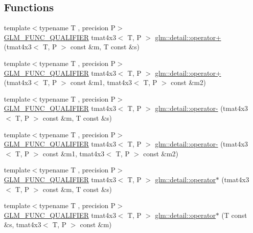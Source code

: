 \subsection*{Functions}
\begin{DoxyCompactItemize}
\item 
{\footnotesize template$<$typename T , precision P$>$ }\\\hyperlink{setup_8hpp_a33fdea6f91c5f834105f7415e2a64407}{G\+L\+M\+\_\+\+F\+U\+N\+C\+\_\+\+Q\+U\+A\+L\+I\+F\+I\+ER} tmat4x3$<$ T, P $>$ \hyperlink{namespaceglm_1_1detail_af0f78ed9e015e6927a0a54ef1c5dd0fb}{glm\+::detail\+::operator+} (tmat4x3$<$ T, P $>$ const \&m, T const \&s)
\item 
{\footnotesize template$<$typename T , precision P$>$ }\\\hyperlink{setup_8hpp_a33fdea6f91c5f834105f7415e2a64407}{G\+L\+M\+\_\+\+F\+U\+N\+C\+\_\+\+Q\+U\+A\+L\+I\+F\+I\+ER} tmat4x3$<$ T, P $>$ \hyperlink{namespaceglm_1_1detail_a5adb1f5a4df1aa7f99e8c354d3c3f9ab}{glm\+::detail\+::operator+} (tmat4x3$<$ T, P $>$ const \&m1, tmat4x3$<$ T, P $>$ const \&m2)
\item 
{\footnotesize template$<$typename T , precision P$>$ }\\\hyperlink{setup_8hpp_a33fdea6f91c5f834105f7415e2a64407}{G\+L\+M\+\_\+\+F\+U\+N\+C\+\_\+\+Q\+U\+A\+L\+I\+F\+I\+ER} tmat4x3$<$ T, P $>$ \hyperlink{namespaceglm_1_1detail_a4dc0075a9d35529c12595e743e4191cd}{glm\+::detail\+::operator-\/} (tmat4x3$<$ T, P $>$ const \&m, T const \&s)
\item 
{\footnotesize template$<$typename T , precision P$>$ }\\\hyperlink{setup_8hpp_a33fdea6f91c5f834105f7415e2a64407}{G\+L\+M\+\_\+\+F\+U\+N\+C\+\_\+\+Q\+U\+A\+L\+I\+F\+I\+ER} tmat4x3$<$ T, P $>$ \hyperlink{namespaceglm_1_1detail_ab53e23d563b216baeb08378221ba5406}{glm\+::detail\+::operator-\/} (tmat4x3$<$ T, P $>$ const \&m1, tmat4x3$<$ T, P $>$ const \&m2)
\item 
{\footnotesize template$<$typename T , precision P$>$ }\\\hyperlink{setup_8hpp_a33fdea6f91c5f834105f7415e2a64407}{G\+L\+M\+\_\+\+F\+U\+N\+C\+\_\+\+Q\+U\+A\+L\+I\+F\+I\+ER} tmat4x3$<$ T, P $>$ \hyperlink{namespaceglm_1_1detail_a5cac9d69f24e876dcf0f3f8d5857e89e}{glm\+::detail\+::operator$\ast$} (tmat4x3$<$ T, P $>$ const \&m, T const \&s)
\item 
{\footnotesize template$<$typename T , precision P$>$ }\\\hyperlink{setup_8hpp_a33fdea6f91c5f834105f7415e2a64407}{G\+L\+M\+\_\+\+F\+U\+N\+C\+\_\+\+Q\+U\+A\+L\+I\+F\+I\+ER} tmat4x3$<$ T, P $>$ \hyperlink{namespaceglm_1_1detail_ae73e13c6882ebf477b7706a1a47fdf78}{glm\+::detail\+::operator$\ast$} (T const \&s, tmat4x3$<$ T, P $>$ const \&m)

\end{DoxyCompactItemize}
